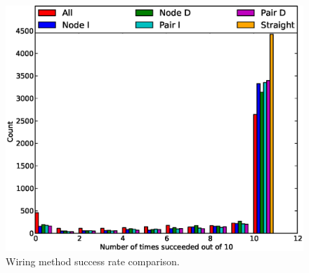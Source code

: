 \begin{figure}[H]
\begin{center}
\includegraphics[width=\textwidth]{Images/wiring_success_comparison.eps}
\caption[Wiring method success rate comparison]{Wiring method success rate
comparison.}
\label{fig:wiring_success}
\end{center}
\end{figure}

